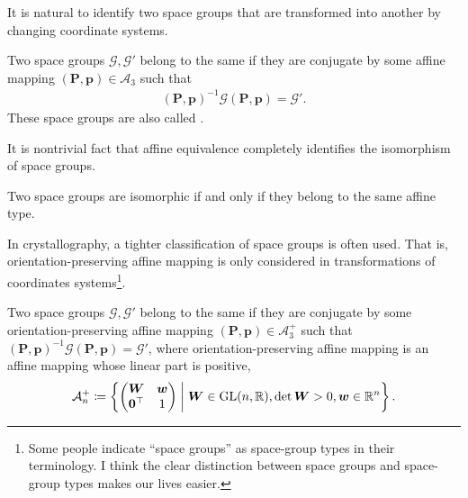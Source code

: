 It is natural to identify two space groups that are transformed into another by changing coordinate systems.

\begin{screen}
  \begin{defn}
    Two space groups $\mathcal{G}, \mathcal{G}'$ belong to the same  if they are conjugate by some affine mapping $(\bm{P}, \bm{p}) \in \mathcal{A}_{3}$ such that
    \begin{align}
      (\bm{P}, \bm{p})^{-1} \mathcal{G} (\bm{P}, \bm{p}) = \mathcal{G}'.
    \end{align}
    These space groups are also called .
  \end{defn}
\end{screen}

It is nontrivial fact that affine equivalence completely identifies the isomorphism of space groups.

\begin{screen}
  \begin{them}[Bieberbach]
    Two space groups are isomorphic if and only if they belong to the same affine type.
  \end{them}
\end{screen}

In crystallography, a tighter classification of space groups is often used.
That is, orientation-preserving affine mapping is only considered in transformations of coordinates systems\footnote{
  Some people indicate ``space groups'' as space-group types in their terminology.
  I think the clear distinction between space groups and space-group types makes our lives easier.
}.

\begin{screen}
  \begin{defn}
    Two space groups $\mathcal{G}, \mathcal{G}'$ belong to the same  if they are conjugate by some orientation-preserving affine mapping $(\bm{P}, \bm{p}) \in \mathcal{A}^{+}_{3}$ such that $(\bm{P}, \bm{p})^{-1} \mathcal{G} (\bm{P}, \bm{p}) = \mathcal{G}'$, where orientation-preserving affine mapping is an affine mapping whose linear part is positive,
    \begin{align}
      \mathcal{A}^{+}_{n} \coloneqq \left\{  \begin{pmatrix} \bm{W} & \bm{w} \\ \bm{0}^{\top} & 1 \end{pmatrix}  \mathrel{}\middle|\mathrel{}  \bm{W} \in \mathrm{GL}(n, \mathbb{R}), \det \bm{W} > 0, \bm{w} \in \mathbb{R}^{n}  \right\}.
    \end{align}
  \end{defn}
\end{screen}

